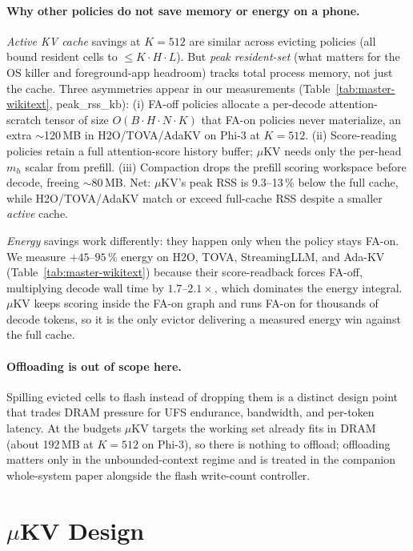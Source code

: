 \documentclass[sigconf, anonymous=false, screen=true]{acmart}
\begin{document}
\paragraph{Why other policies do not save memory or energy on a phone.} \textit{Active KV cache} savings at $K{=}512$ are similar across evicting policies (all bound resident cells to $\le K{\cdot}H{\cdot}L$). But \emph{peak resident-set} (what matters for the OS killer and foreground-app headroom) tracks total process memory, not just the cache. Three asymmetries appear in our measurements (Table~\ref{tab:master-wikitext}, peak\_rss\_kb): (i) FA-off policies allocate a per-decode attention-scratch tensor of size $O(B {\cdot} H {\cdot} N {\cdot} K)$ that FA-on policies never materialize, an extra $\sim$120\,MB in H2O/TOVA/AdaKV on Phi-3 at $K{=}512$. (ii) Score-reading policies retain a full attention-score history buffer; $\mu$KV needs only the per-head $m_h$ scalar from prefill. (iii) Compaction drops the prefill scoring workspace before decode, freeing $\sim$80\,MB. Net: $\mu$KV's peak RSS is 9.3--13\,\% below the full cache, while H2O/TOVA/AdaKV match or exceed full-cache RSS despite a smaller \emph{active} cache.

\emph{Energy} savings work differently: they happen only when the policy stays FA-on. We measure $+45$--$95\,\%$ energy on H2O, TOVA, StreamingLLM, and Ada-KV (Table~\ref{tab:master-wikitext}) because their score-readback forces FA-off, multiplying decode wall time by $1.7$--$2.1\times$, which dominates the energy integral. $\mu$KV keeps scoring inside the FA-on graph and runs FA-on for thousands of decode tokens, so it is the only evictor delivering a measured energy win against the full cache.

\paragraph{Offloading is out of scope here.} Spilling evicted cells to flash instead of dropping them is a distinct design point that trades DRAM pressure for UFS endurance, bandwidth, and per-token latency. At the budgets $\mu$KV targets the working set already fits in DRAM (about 192\,MB at $K{=}512$ on Phi-3), so there is nothing to offload; offloading matters only in the unbounded-context regime and is treated in the companion whole-system paper alongside the flash write-count controller.

\section{$\mu$KV Design}
\label{sec:design}
\end{document}
